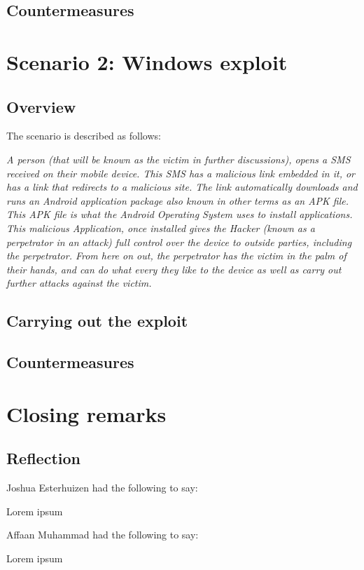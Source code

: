 \documentclass[a4paper, 12pt, titlepage]{report}
\begin{document}
\section{Countermeasures}
\chapter{Scenario 2: Windows exploit}
\section{Overview}
The scenario is described as follows:
\begin{displayquote}
\textit{A person (that will be known as the victim in further discussions), opens a SMS received on their mobile device. This SMS has a malicious link embedded in it, or has a link that redirects to a malicious site. The link automatically downloads and runs an Android application package also known in other terms as an APK file. This APK file is what the Android Operating System uses to install applications. This malicious Application, once installed gives the Hacker (known as a perpetrator in an attack) full control over the device to outside parties, including the perpetrator. From here on out, the perpetrator has the victim in the palm of their hands, and can do what every they like to the device as well as carry out further attacks against the victim.}
\end{displayquote}
\section{Carrying out the exploit}
\section{Countermeasures}
\chapter{Closing remarks}
\section{Reflection}
Joshua Esterhuizen had the following to say:
\begin{displayquote}
Lorem ipsum
\end{displayquote}
Affaan Muhammad had the following to say:
\begin{displayquote}
Lorem ipsum
\end{displayquote}
\end{document}
